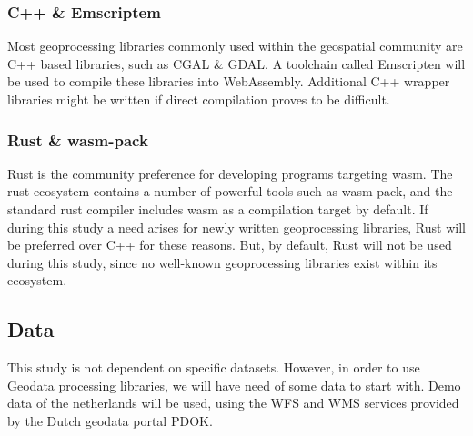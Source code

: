\subsubsection*{C++ \& Emscriptem}
Most geoprocessing libraries commonly used within the geospatial community are C++ based libraries, such as CGAL \& GDAL. A toolchain called Emscripten will be used to compile these libraries into WebAssembly. Additional C++ wrapper libraries might be written if direct compilation proves to be difficult. 

\subsubsection*{Rust \& wasm-pack}
Rust is the community preference for developing programs targeting wasm. 
The rust ecosystem contains a number of powerful tools such as wasm-pack, and the standard rust compiler includes wasm as a compilation target by default. If during this study a need arises for newly written geoprocessing libraries, Rust will be preferred over C++ for these reasons. But, by default, Rust will not be used during this study, since no well-known geoprocessing libraries exist within its ecosystem.

\subsection{Data}
This study is not dependent on specific datasets. However, in order to use Geodata processing libraries, we will have need of some data to start with. Demo data of the netherlands will be used, using the WFS and WMS services provided by the Dutch geodata portal PDOK. 
